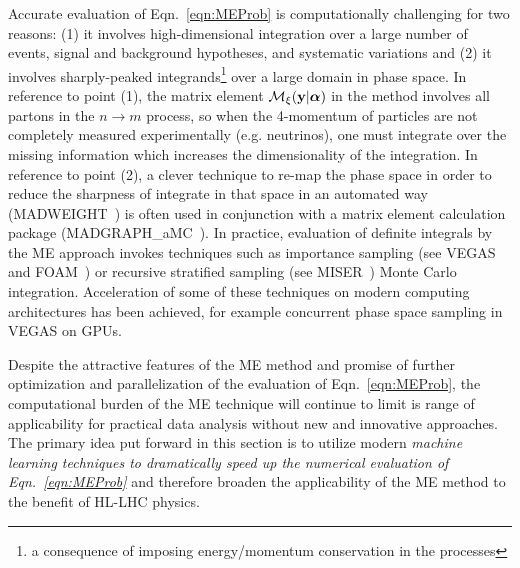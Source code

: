 Accurate evaluation of Eqn.~\ref{eqn:MEProb} is computationally challenging for two reasons: (1) it involves high-dimensional integration over a large number of events, signal and background hypotheses, and systematic variations and (2) it involves sharply-peaked integrands\footnote{a consequence of imposing energy/momentum conservation in the processes} over a large domain in phase space. In reference to point (1), the matrix element $\mathcal{M}_{\xi}({\bf y}|\boldsymbol\alpha)$ in the method involves all partons in the $n\rightarrow m$ process, so when the 4-momentum of particles are not completely measured experimentally (e.g. neutrinos), one must integrate over the missing information which increases the dimensionality of the integration. In reference to point (2), a clever technique to re-map the phase space in order to reduce the sharpness of integrate in that space in an automated way ({\sf MADWEIGHT}~\cite{Artoisenet:2010cn}) is often used in conjunction with a matrix element calculation package ({\sf MADGRAPH\_aMC\@NLO}~\cite{Alwall:2014hca}). In practice, evaluation of definite integrals by the ME approach invokes techniques such as importance sampling (see {\sf VEGAS}~\cite{PETERLEPAGE1978192,Ohl:1998jn} and {\sf FOAM}~\cite{JADACH200355}) or recursive stratified sampling (see MISER~\cite{Press:1989vk}) Monte Carlo integration. Acceleration of some of these techniques on modern computing architectures has been achieved, for example concurrent phase space sampling in VEGAS on GPUs.

Despite the attractive features of the ME method and promise of further optimization and parallelization of the evaluation of Eqn.~\ref{eqn:MEProb}, the computational burden of the ME technique will continue to limit is range of applicability for practical data analysis without new and innovative approaches. The primary idea put forward in this section is to utilize modern \emph{machine learning techniques to dramatically speed up the numerical evaluation of Eqn.~\ref{eqn:MEProb}} and therefore broaden the applicability of the ME method to the benefit of HL-LHC physics.

